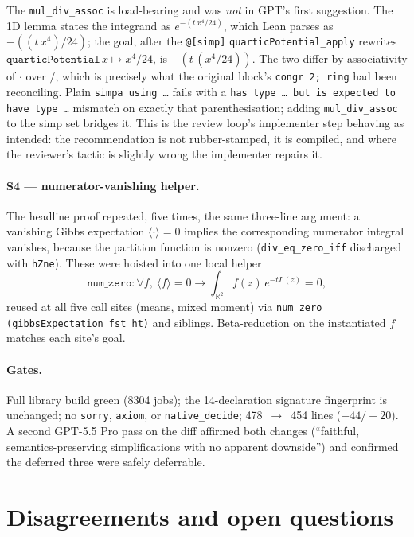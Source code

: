 \documentclass[11pt]{article}
\begin{document}
The \texttt{mul\_div\_assoc} is load-bearing and was \emph{not} in GPT's first
suggestion. The 1D lemma states the integrand as $e^{-(t\,x^4/24)}$, which Lean
parses as $-((t\,x^4)/24)$; the goal, after the \texttt{@[simp]}
\texttt{quarticPotential\_apply} rewrites $\texttt{quarticPotential}\,x\mapsto
x^4/24$, is $-(t\,(x^4/24))$. The two differ by associativity of $\cdot$ over $/$,
which is precisely what the original block's \texttt{congr 2; ring} had been
reconciling. Plain \texttt{simpa using \dots} fails with a
\texttt{has type \dots\ but is expected to have type \dots} mismatch on exactly that
parenthesisation; adding \texttt{mul\_div\_assoc} to the simp set bridges it. This
is the review loop's implementer step behaving as intended: the recommendation is
not rubber-stamped, it is compiled, and where the reviewer's tactic is slightly
wrong the implementer repairs it.

\paragraph{S4 --- numerator-vanishing helper.} The headline proof repeated, five
times, the same three-line argument: a vanishing Gibbs expectation
$\langle\cdot\rangle=0$ implies the corresponding numerator integral vanishes,
because the partition function is nonzero (\texttt{div\_eq\_zero\_iff} discharged
with \texttt{hZne}). These were hoisted into one local helper
\[
  \texttt{num\_zero} : \forall f,\ \langle f\rangle = 0 \to
    \textstyle\int_{\mathbb{R}^2} f(z)\,e^{-tL(z)} = 0,
\]
reused at all five call sites (means, mixed moment) via
\texttt{num\_zero \_ (gibbsExpectation\_fst ht)} and siblings. Beta-reduction on the
instantiated $f$ matches each site's goal.

\paragraph{Gates.} Full library build green (8304 jobs); the 14-declaration
signature fingerprint is unchanged; no \texttt{sorry}, \texttt{axiom}, or
\texttt{native\_decide}; 478~$\to$~454 lines ($-44/+20$). A second GPT-5.5 Pro pass
on the diff affirmed both changes (``faithful, semantics-preserving simplifications
with no apparent downside'') and confirmed the deferred three were safely
deferrable.

\section{Disagreements and open questions}
\end{document}
